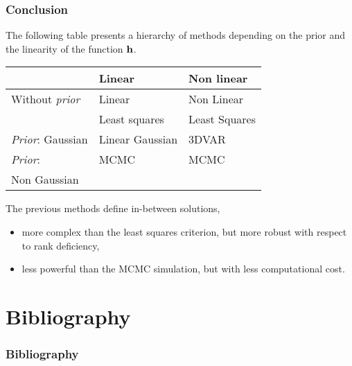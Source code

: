 \documentclass[aspectratio=169]{beamer}
\begin{document}
\begin{frame}
\frametitle{Conclusion}

The following table presents a hierarchy of methods depending on the 
prior and the linearity of the function ${\bf h}$.

\begin{center}
\begin{tabular}{lll}
                     & {\bf Linear}  & {\bf Non linear} \\
\hline
Without \emph{prior} & Linear        & Non Linear \\
                     & Least squares & Least Squares \\
\hline
\emph{Prior}: Gaussian & Linear Gaussian & 3DVAR \\
\hline
\emph{Prior}: & MCMC & MCMC \\
Non Gaussian &  &  \\
\hline
\end{tabular}
\end{center}

The previous methods define in-between solutions, 
\begin{itemize}
\item more complex than the least squares criterion, but more robust with 
respect to rank deficiency, 
\item less powerful than the MCMC simulation, but with less computational 
cost. 
\end{itemize}

\end{frame}

\section{Bibliography}
\begin{frame}[allowframebreaks]
\frametitle{Bibliography}
\nocite{*}


\end{frame}
\end{document}
